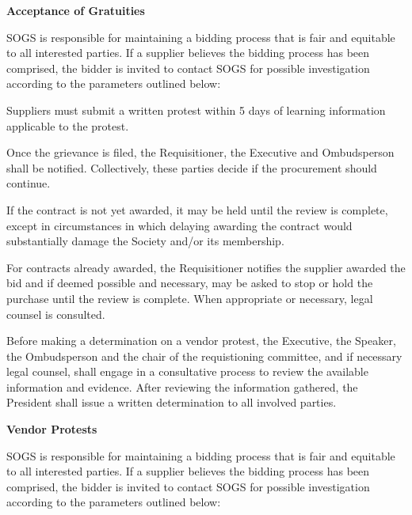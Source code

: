 \begin{longenum}[label*=\thesection.\arabic*., align=left]
\item \textbf{Acceptance of Gratuities}

\begin{longenum} [label*=\arabic*., align=left]
		\item SOGS is responsible for maintaining a bidding process that is fair and equitable to all interested parties. If a supplier believes the bidding process has been comprised, the bidder is invited to contact SOGS for possible investigation according to the parameters outlined below:
		
		\item Suppliers must submit a written protest within 5 days of learning information applicable to the protest.
		
		\item Once the grievance is filed, the Requisitioner, the Executive and Ombudsperson shall be notified. Collectively, these parties decide if the procurement should continue. 
		
		\item If the contract is not yet awarded, it may be held until the review is complete, except in circumstances in which delaying awarding the contract would substantially damage the Society and/or its membership. 
		
		\item For contracts already awarded, the Requisitioner notifies the supplier awarded the bid and if deemed possible and necessary, may be asked to stop or hold the purchase until the review is complete. When appropriate or necessary, legal counsel is consulted.
		
		\item Before making a determination on a vendor protest, the Executive, the Speaker, the Ombudsperson and the chair of the requistioning committee, and if necessary legal counsel, shall engage in a consultative process to review the available information and evidence. After reviewing the information gathered, the President shall issue a written determination to all involved parties.
\end{longenum}

\item \textbf{Vendor Protests}
\begin{longenum} [label*=\arabic*., align=left]


\item SOGS is responsible for maintaining a bidding process that is fair and equitable to all interested parties. If a supplier believes the bidding process has been comprised, the bidder is invited to contact SOGS for possible investigation according to the parameters outlined below:


\end{longenum}
\end{longenum}
